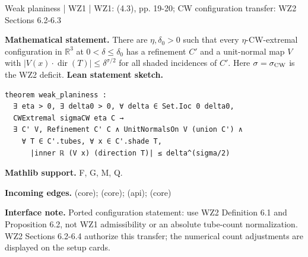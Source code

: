 \documentclass[10pt,a4paper]{article}
\newcommand{\nodecard}[1]{\hyperlink{node-#1}{\texttt{\detokenize{#1}}}}
\begin{document}
\begin{minipage}{\linewidth}
\hypertarget{node-L4_3}{}
\begin{tcolorbox}[colback=white,colframe=planefg,colbacktitle=planebg,coltitle=ink,boxrule=0.45pt,arc=1.6mm,left=3mm,right=3mm,top=2mm,bottom=2mm,title={\sffamily\bfseries WZ1 Lemma 4.3 / CW \hfill \texttt{L4\_3}}]
{\sffamily\small\color{muted}Weak planiness | WZ1 | WZ1: (4.3), pp. 19-20; CW configuration transfer: WZ2 Sections 6.2-6.3}\par
\textbf{Mathematical statement.} There are $\eta,\delta_0>0$ such that every $\eta$-CW-extremal configuration in $\mathbb R^3$ at $0<\delta\le\delta_0$ has a refinement $C'$ and a unit-normal map $V$ with
$|V(x)\cdot\operatorname{dir}(T)|\le\delta^{\sigma/2}$ for all shaded incidences of $C'$.
Here $\sigma=\sigma_{\rm CW}$ is the WZ2 deficit.
\smallskip\textbf{Lean statement sketch.}
\begin{Verbatim}[fontsize=\small,breaklines=true,breakanywhere=true,tabsize=2]
theorem weak_planiness :
  ∃ eta > 0, ∃ delta0 > 0, ∀ delta ∈ Set.Ioc 0 delta0,
  CWExtremal sigmaCW eta C →
  ∃ C' V, Refinement C' C ∧ UnitNormalsOn V (union C') ∧
    ∀ T ∈ C'.tubes, ∀ x ∈ C'.shade T,
      |inner ℝ (V x) (direction T)| ≤ delta^(sigma/2)
\end{Verbatim}
{\footnotesize\textbf{Mathlib support.} F, G, M, Q.\par
\textbf{Incoming edges.} \nodecard{T4_2} (core); \nodecard{L3_4} (core); \nodecard{Imass} (api); \nodecard{Ienvelope} (core)\par}
{\footnotesize\textbf{Interface note.}  Ported configuration statement: use WZ2 Definition 6.1 and Proposition 6.2, not WZ1 admissibility or an absolute tube-count normalization. WZ2 Sections 6.2-6.4 authorize this transfer; the numerical count adjustments are displayed on the setup cards.}
\end{tcolorbox}\end{minipage}\par\medskip
\end{document}
